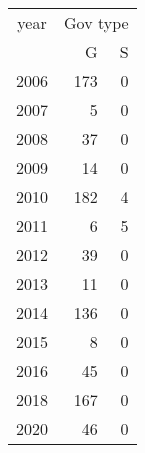 \footnotesize\begin{tabular}[t]{lrr}
\toprule
\multicolumn{1}{c}{year} & \multicolumn{2}{c}{Gov type} \\
\cmidrule(l{3pt}r{3pt}){1-1} \cmidrule(l{3pt}r{3pt}){2-3}
  & G & S\\
\midrule
2006 & 173 & 0\\
2007 & 5 & 0\\
2008 & 37 & 0\\
2009 & 14 & 0\\
2010 & 182 & 4\\
2011 & 6 & 5\\
2012 & 39 & 0\\
2013 & 11 & 0\\
2014 & 136 & 0\\
2015 & 8 & 0\\
2016 & 45 & 0\\
2018 & 167 & 0\\
2020 & 46 & 0\\
\bottomrule
\end{tabular}
